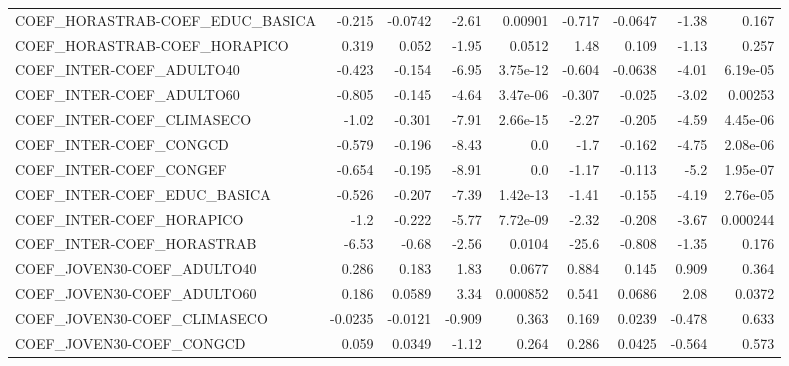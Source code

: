 \begin{tabular}{lrrrrrrrr}
COEF\_HORASTRAB-COEF\_EDUC\_BASICA       &      -0.215 &      -0.0742 &    -2.61 &  0.00901 &     -0.717 &     -0.0647 &        -1.38 &         0.167 \\
COEF\_HORASTRAB-COEF\_HORAPICO          &       0.319 &        0.052 &    -1.95 &   0.0512 &       1.48 &       0.109 &        -1.13 &         0.257 \\
COEF\_INTER-COEF\_ADULTO40              &      -0.423 &       -0.154 &    -6.95 & 3.75e-12 &     -0.604 &     -0.0638 &        -4.01 &      6.19e-05 \\
COEF\_INTER-COEF\_ADULTO60              &      -0.805 &       -0.145 &    -4.64 & 3.47e-06 &     -0.307 &      -0.025 &        -3.02 &       0.00253 \\
COEF\_INTER-COEF\_CLIMASECO             &       -1.02 &       -0.301 &    -7.91 & 2.66e-15 &      -2.27 &      -0.205 &        -4.59 &      4.45e-06 \\
COEF\_INTER-COEF\_CONGCD                &      -0.579 &       -0.196 &    -8.43 &      0.0 &       -1.7 &      -0.162 &        -4.75 &      2.08e-06 \\
COEF\_INTER-COEF\_CONGEF                &      -0.654 &       -0.195 &    -8.91 &      0.0 &      -1.17 &      -0.113 &         -5.2 &      1.95e-07 \\
COEF\_INTER-COEF\_EDUC\_BASICA           &      -0.526 &       -0.207 &    -7.39 & 1.42e-13 &      -1.41 &      -0.155 &        -4.19 &      2.76e-05 \\
COEF\_INTER-COEF\_HORAPICO              &        -1.2 &       -0.222 &    -5.77 & 7.72e-09 &      -2.32 &      -0.208 &        -3.67 &      0.000244 \\
COEF\_INTER-COEF\_HORASTRAB             &       -6.53 &        -0.68 &    -2.56 &   0.0104 &      -25.6 &      -0.808 &        -1.35 &         0.176 \\
COEF\_JOVEN30-COEF\_ADULTO40            &       0.286 &        0.183 &     1.83 &   0.0677 &      0.884 &       0.145 &        0.909 &         0.364 \\
COEF\_JOVEN30-COEF\_ADULTO60            &       0.186 &       0.0589 &     3.34 & 0.000852 &      0.541 &      0.0686 &         2.08 &        0.0372 \\
COEF\_JOVEN30-COEF\_CLIMASECO           &     -0.0235 &      -0.0121 &   -0.909 &    0.363 &      0.169 &      0.0239 &       -0.478 &         0.633 \\
COEF\_JOVEN30-COEF\_CONGCD              &       0.059 &       0.0349 &    -1.12 &    0.264 &      0.286 &      0.0425 &       -0.564 &         0.573 \\

\end{tabular}
